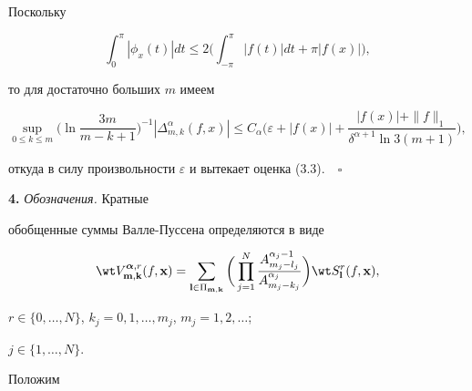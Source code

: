 Поскольку


$$


\int_0^\pi |\phi_x(t)|dt \le 2\bigg(\int_{-\pi}^\pi |f(t)|dt +\pi 


|f(x)|\bigg),


$$


то для достаточно больших $m$ имеем


\begin{equation*}


\sup_{0\le k\le m}\bigg(\ln \frac {3m}{m-k+1} \bigg)^{-1}


|\Delta_{m,k}^{\alpha}(f,x)|\le C_\alpha \bigg(\varepsilon + |f(x)|


+\frac{|f(x)|+\|f\|_1}{\delta^{\alpha+1}\ln {3(m+1)}}\bigg),


\end{equation*}


откуда в силу произвольности $\varepsilon$ и вытекает оценка (3.3).$\quad\square$


\medskip





\addtocounter{section}{1}


\setcounter{equation}{0}


\setcounter{lems}{0}


\setcounter{thms}{0}








{\bf 4.} {\it Обозначения.} Кратные


обобщенные суммы Валле-Пуссена определяются в виде


\begin{equation}


\wt V_{{\bold m},{\bold k}}^{{\boldsymbol{\alpha}},r}(f,{\bold x})=


\sum_{{\bold l}\in \Pi_{{\bold m},{\bold k}}}\bigg(\prod_{j=1}^N \frac


{A_{m_j-l_j}^{\alpha_j-1}}{A_{m_j-k_j}^{\alpha_j}}\bigg)\wt S^r_{\bold l}(f,


{\bold x}),


\end{equation}


$r\in\{0,\dotsc,N\}$, $k_j=0,1,\dotsc,m_j$, $m_j=1,2,\dotsc$;


$j\in \{1,\dotsc,N\}$.





Положим


